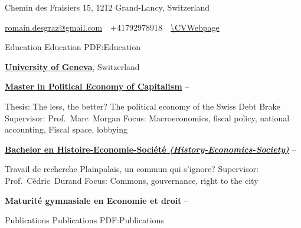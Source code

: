 \documentclass[letterpaper,MMMyyyy,nonstopmode]{simpleresumecv}
\newcommand{\CVAuthor}{Romain Desgraz}
\begin{document}

\Title{\CVAuthor}

\begin{SubTitle}

{Chemin des Fraisiers 15, 1212 Grand-Lancy, Switzerland}
\par
\href{mailto:romain.desgraz@gmail.com}
{romain.desgraz@gmail.com}
\,\SubBulletSymbol\,
+41792978918
\,\SubBulletSymbol\,
\href{\CVWebpage}
{\url{\CVWebpage}}
\end{SubTitle}

\begin{Body}


\Section
{Education}
{Education}
{PDF:Education}

\Entry
\href{https://www.unige.ch/}
{\textbf{University of Geneva}}, Switzerland

\BigGap
\BulletItem
\href{https://www.unige.ch/sciences-societe/formations/masters-in-english/political-economy-of-capitalism/}
{\textbf{Master in Political Economy of Capitalism}}
\hfill
{} --
\begin{Detail}
\SubBulletItem
Thesis:
{The less, the better? The political economy of the Swiss Debt Brake}
\SubBulletItem
Supervisor: 
Prof.~Marc~Morgan
\SubBulletItem
Focus:
Macroeconomics, fiscal policy, national accounting, Fiscal space, lobbying
\end{Detail}

\BigGap
\BulletItem
\href{https://www.unige.ch/sciences-societe/formations/bachelors/histoire-economie-societe/}
{\textbf{Bachelor en Histoire-Economie-Société \textit{(History-Economics-Society)}}}
\hfill
{} --
\begin{Detail}
\SubBulletItem
Travail de recherche
Plainpalais, un commun qui s'ignore?
\SubBulletItem
Supervisor: 
Prof.~Cédric~Durand
\SubBulletItem
Focus:
Commons, gouvernance, right to the city 
\end{Detail}

\Gap
\BulletItem
\textbf{Maturité gymnasiale en Economie et droit}
\hfill
{} --





\Section
{Publications}
{Publications}
{PDF:Publications}


\end{Body}
\end{document}
